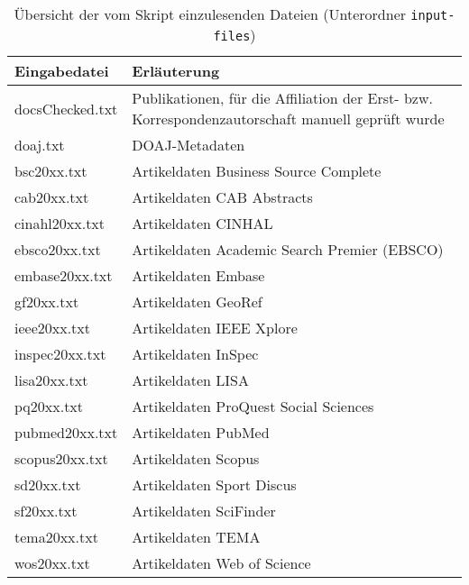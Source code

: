 \begin{appendices}
\begin{table}[h]
\caption{Übersicht der vom Skript einzulesenden Dateien (Unterordner \texttt{input-files})}
    \begin{tabularx}{1\textwidth}{p{5cm}p{9cm}}
    \toprule
     Eingabedatei & Erläuterung \\
     \midrule
     docsChecked.txt & Publikationen, für die Affiliation der Erst- bzw. Korrespondenzautorschaft manuell geprüft wurde \\
    doaj.txt & DOAJ-Metadaten \\
    \midrule
    bsc20xx.txt & Artikeldaten Business Source Complete \\
    cab20xx.txt & Artikeldaten CAB Abstracts \\
    cinahl20xx.txt & Artikeldaten CINHAL \\
    ebsco20xx.txt & Artikeldaten Academic Search Premier (EBSCO) \\
    embase20xx.txt & Artikeldaten Embase \\
    gf20xx.txt & Artikeldaten GeoRef \\
    ieee20xx.txt & Artikeldaten IEEE Xplore \\
    inspec20xx.txt & Artikeldaten InSpec \\
    lisa20xx.txt & Artikeldaten LISA \\
    pq20xx.txt & Artikeldaten ProQuest Social Sciences \\
    pubmed20xx.txt & Artikeldaten PubMed \\
    scopus20xx.txt & Artikeldaten Scopus \\
    sd20xx.txt & Artikeldaten Sport Discus \\
    sf20xx.txt & Artikeldaten SciFinder \\
    tema20xx.txt & Artikeldaten TEMA \\
    wos20xx.txt & Artikeldaten Web of Science \\
    \bottomrule
    \end{tabularx}
\end{table}


\end{appendices}

